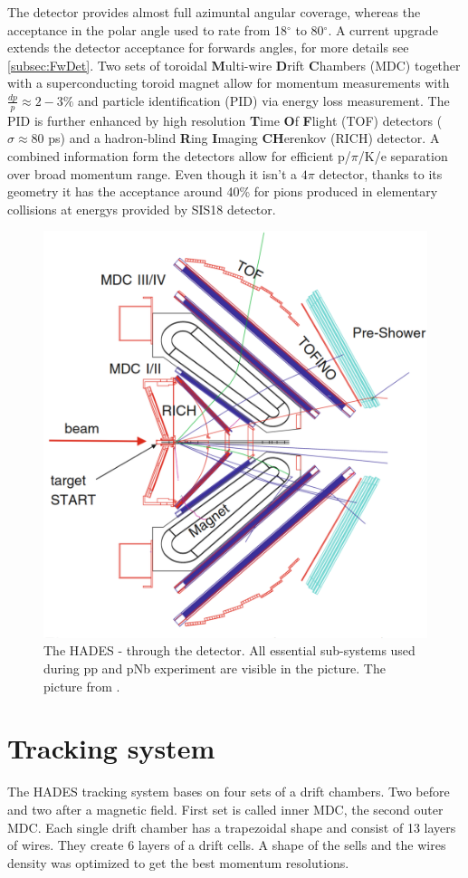 The detector provides almost full azimuntal angular coverage, whereas the acceptance in the polar angle used to rate from 18$^{\circ}$  to 80$^{\circ}$. A current upgrade extends the detector acceptance for forwards angles, for more details see \ref{subsec:FwDet}. Two sets of toroidal \textbf{M}ulti-wire \textbf{D}rift \textbf{C}hambers (MDC) together with a superconducting toroid magnet allow for momentum measurements with $\frac{dp}{p} \approx 2-3\%$ and particle identification (PID) via energy loss measurement. The PID is further enhanced by high resolution \textbf{T}ime \textbf{O}f \textbf{F}light (TOF) detectors ($\sigma \approx 80$ ps) and a hadron-blind \textbf{R}ing \textbf{I}maging \textbf{CH}erenkov (RICH) detector. A combined information form the detectors allow for efficient p/$\pi$/K/e separation over broad momentum range. Even though it isn't a $4 \pi$ detector, thanks to its geometry it has the acceptance around 40\% for pions produced in elementary collisions at energys provided by SIS18 detector.
\begin{figure}
  \centering
  \includegraphics[width=0.7 \linewidth]{Chapter_detector/detektor.eps}
  \caption{The HADES - \cs through the detector. All essential sub-systems used during pp and pNb experiment are visible in the picture. The picture from \cite{Agakishiev:2009am}.}
\end{figure}

\section{Tracking system}
The HADES tracking system bases on four sets of a drift chambers. Two before and two after a magnetic field. First set is called inner MDC, the second outer MDC. Each single drift chamber has a trapezoidal shape and consist of 13 layers of wires. They create 6 layers of a drift cells. A shape of the sells and the wires density was optimized to get the best momentum resolutions.

